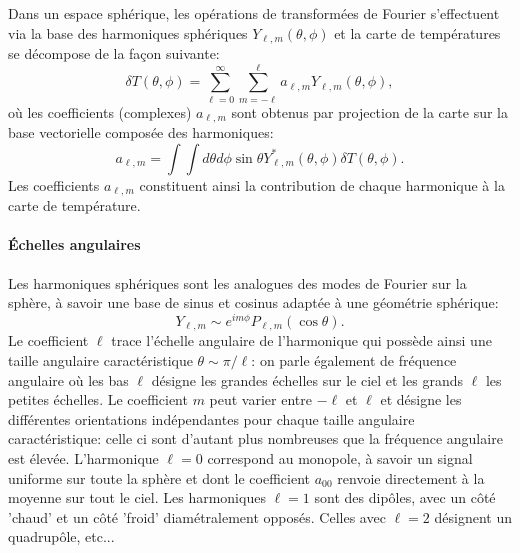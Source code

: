 Dans un espace sphérique, les opérations de transformées de Fourier s'effectuent via la base des harmoniques sphériques $Y_{\ell,m}(\theta,\phi)$ et la carte de températures se décompose de la façon suivante:
\begin{equation}
\delta T(\theta,\phi)= \sum_{\ell=0}^{\infty}\sum_{m=-\ell}^{\ell} a_{\ell,m} Y_{\ell,m}(\theta,\phi),
\end{equation}
où les coefficients (complexes) $a_{\ell,m}$ sont obtenus par projection de la carte sur la base vectorielle composée des harmoniques:
\begin{equation}
a_{\ell,m}=\int \int d\theta d\phi\sin \theta Y^*_{\ell,m}(\theta,\phi) \delta T(\theta,\phi).
\end{equation}
Les coefficients $a_{\ell,m}$ constituent ainsi la contribution de chaque harmonique à la carte de température.

\paragraph{Échelles angulaires}
 Les harmoniques sphériques sont les analogues des modes de Fourier sur la sphère, à savoir une base de sinus et cosinus adaptée à une géométrie sphérique:
\begin{equation}
Y_{\ell,m}\sim e^{im\phi} P_{\ell,m}(\cos \theta).
\end{equation} 
 Le coefficient $\ell$ trace l'échelle angulaire de l'harmonique qui possède ainsi une taille angulaire caractéristique $\theta\sim\pi/\ell$: on parle également de fréquence angulaire où les bas $\ell$ désigne les grandes échelles sur le ciel et les grands $\ell$ les petites échelles. Le coefficient $m$ peut varier entre $-\ell$ et $\ell$ et désigne les différentes orientations indépendantes pour chaque taille angulaire caractéristique: celle ci sont d'autant plus nombreuses que la fréquence angulaire est élevée. L'harmonique $\ell=0$ correspond au monopole, à savoir un signal uniforme sur toute la sphère et dont le coefficient $a_{00}$ renvoie directement à la moyenne sur tout le ciel. Les harmoniques $\ell=1$ sont des dipôles, avec un côté 'chaud' et un côté 'froid' diamétralement opposés. Celles avec $\ell=2$ désignent un quadrupôle, etc...

